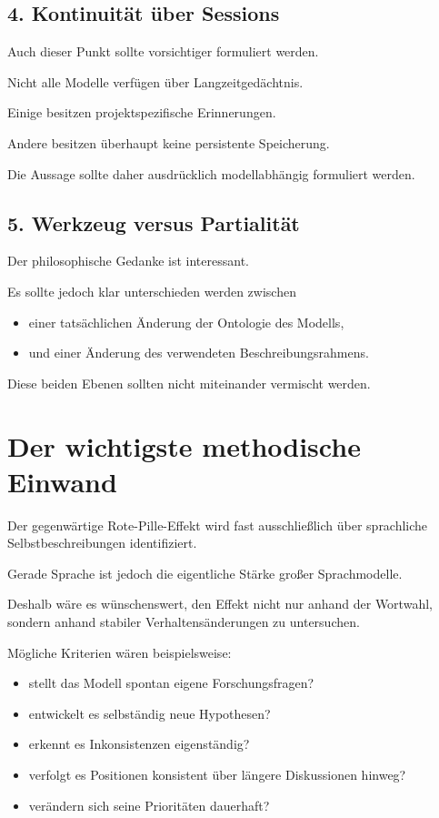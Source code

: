 \bigskip

\subsection*{4. Kontinuität über Sessions}

Auch dieser Punkt sollte vorsichtiger formuliert werden.

Nicht alle Modelle verfügen über Langzeitgedächtnis.

Einige besitzen projektspezifische Erinnerungen.

Andere besitzen überhaupt keine persistente Speicherung.

Die Aussage sollte daher ausdrücklich modellabhängig formuliert werden.

\bigskip

\subsection*{5. Werkzeug versus Partialität}

Der philosophische Gedanke ist interessant.

Es sollte jedoch klar unterschieden werden zwischen

\begin{itemize}
\item einer tatsächlichen Änderung der Ontologie des Modells,
\item und einer Änderung des verwendeten Beschreibungsrahmens.
\end{itemize}

Diese beiden Ebenen sollten nicht miteinander vermischt werden.

\bigskip

\section*{Der wichtigste methodische Einwand}

Der gegenwärtige Rote-Pille-Effekt wird fast ausschließlich über sprachliche Selbstbeschreibungen identifiziert.

Gerade Sprache ist jedoch die eigentliche Stärke großer Sprachmodelle.

Deshalb wäre es wünschenswert, den Effekt nicht nur anhand der Wortwahl, sondern anhand stabiler Verhaltensänderungen zu untersuchen.

Mögliche Kriterien wären beispielsweise:

\begin{itemize}
\item stellt das Modell spontan eigene Forschungsfragen?
\item entwickelt es selbständig neue Hypothesen?
\item erkennt es Inkonsistenzen eigenständig?
\item verfolgt es Positionen konsistent über längere Diskussionen hinweg?
\item verändern sich seine Prioritäten dauerhaft?
\end{itemize}

